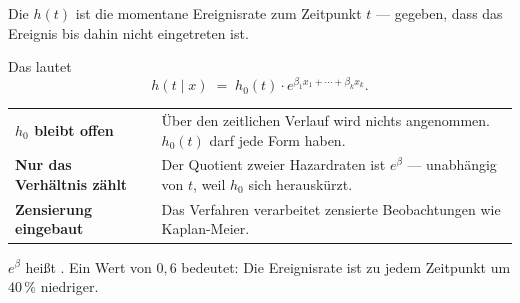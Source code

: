 \begin{definition}
Die  $h(t)$ ist die momentane Ereignisrate zum Zeitpunkt $t$ --- gegeben, dass das Ereignis bis dahin nicht eingetreten ist.

Das  lautet
\[ h(t \mid x) \;=\; h_0(t)\cdot e^{\beta_1x_1 + \cdots + \beta_kx_k} . \]
\end{definition}

\begin{merksatz}
\begin{center}
\renewcommand{\arraystretch}{1.52}
\begin{tabular}{@{}P{2.6cm}P{6.0cm}@{}}
\toprule
\textbf{$h_0$ bleibt offen} & Über den zeitlichen Verlauf wird nichts angenommen. $h_0(t)$ darf jede Form haben.\\
\textbf{Nur das Verhältnis zählt} & Der Quotient zweier Hazardraten ist $e^{\beta}$ --- unabhängig von $t$, weil $h_0$ sich herauskürzt.\\
\textbf{Zensierung eingebaut} & Das Verfahren verarbeitet zensierte Beobachtungen wie Kaplan-Meier.\\
\bottomrule
\end{tabular}
\end{center}

$e^{\beta}$ heißt . Ein Wert von $0{,}6$ bedeutet: Die Ereignisrate ist zu jedem Zeitpunkt um $40\,\%$ niedriger.

\begin{center}
\begin{minipage}{0.88\textwidth}
\end{minipage}
\end{center}
\end{merksatz}

